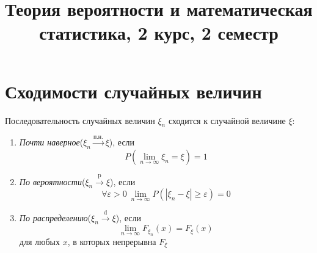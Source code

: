 


\title{Теория вероятности и математическая статистика, 2 курс, 2 семестр}



\maketitle


\tableofcontents

\clearpage

\section{Сходимости случайных величин}

\begin{definition}
Последовательность случайных величин $\xi_{n}$ сходится к случайной величине $\xi$:
\begin{enumerate}
\item \textit{Почти наверное}($\xi_{n} \xrightarrow{\text{п.н.}} \xi$), если 
\[
    P\left(\lim_{n \to \infty} \xi_{n} = \xi\right) = 1
\]
\item \textit{По вероятности}($\xi_{n} \xrightarrow{\text{p}} \xi$), если
\[
    \forall \varepsilon > 0 \ \lim_{n \to \infty} P\left(|\xi_{n} - \xi| \geq \varepsilon\right) = 0
\]
\item \textit{По распределению}($\xi_{n} \xrightarrow{\text{d}} \xi$), если 
\[
    \lim_{n \to \infty} F_{\xi_{n}}\left(x\right) = F_{\xi}\left(x\right)
\]
для любых $x$, в которых непрерывна $F_{\xi}$
\end{enumerate}
\end{definition}

